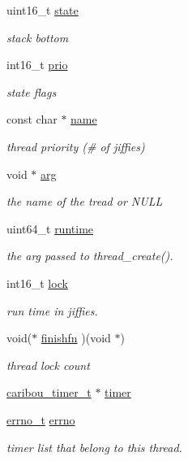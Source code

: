 \begin{DoxyCompactItemize}
uint16\-\_\-t \hyperlink{struct__caribou__thread__t_a9896ce34d6cb9832eca2456d281b2eec}{state}
\begin{DoxyCompactList}\small\item\em stack bottom \end{DoxyCompactList}\item 
int16\-\_\-t \hyperlink{struct__caribou__thread__t_a91f8936a0a3a5c21c4ffcbe1045c34ee}{prio}
\begin{DoxyCompactList}\small\item\em state flags \end{DoxyCompactList}\item 
const char $\ast$ \hyperlink{struct__caribou__thread__t_af6982a95fce8e2c99023a803d903707b}{name}
\begin{DoxyCompactList}\small\item\em thread priority (\# of jiffies) \end{DoxyCompactList}\item 
void $\ast$ \hyperlink{struct__caribou__thread__t_a35f2bbe0ed40746c1505382dbb5cd865}{arg}
\begin{DoxyCompactList}\small\item\em the name of the tread or N\-U\-L\-L \end{DoxyCompactList}\item 
uint64\-\_\-t \hyperlink{struct__caribou__thread__t_a942c87c4803e79dabc7fd0b5e24afb63}{runtime}
\begin{DoxyCompactList}\small\item\em the arg passed to thread\-\_\-create(). \end{DoxyCompactList}\item 
int16\-\_\-t \hyperlink{struct__caribou__thread__t_a3f291721c2674ea6c5776d014357144b}{lock}
\begin{DoxyCompactList}\small\item\em run time in jiffies. \end{DoxyCompactList}\item 
void($\ast$ \hyperlink{struct__caribou__thread__t_abf99478d61f893fa11b938c562a9ef20}{finishfn} )(void $\ast$)
\begin{DoxyCompactList}\small\item\em thread lock count \end{DoxyCompactList}\item 
\hyperlink{timer_8h_a83310ffb8b0e689ad504298d2b80ead7}{caribou\-\_\-timer\-\_\-t} $\ast$ \hyperlink{struct__caribou__thread__t_a0b044d7f5d93f8d457ff985f0f7e4bd3}{timer}
\item 
\hyperlink{errno_8h_a46a037236862ac1a534efbe605c10f42}{errno\-\_\-t} \hyperlink{struct__caribou__thread__t_a4a14ec3ec88fb5528f43e53686271828}{errno}
\begin{DoxyCompactList}\small\item\em timer list that belong to this thread. \end{DoxyCompactList}\end{DoxyCompactItemize}


